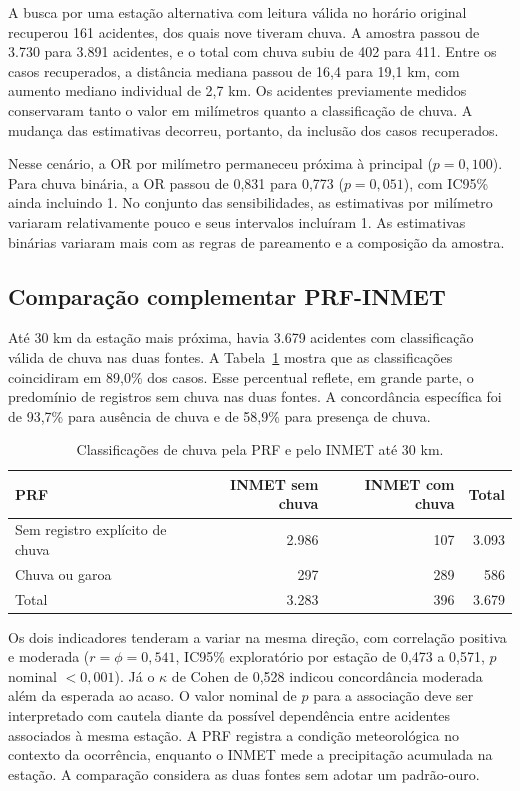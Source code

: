 \documentclass[12pt]{article}
\begin{document}
A busca por uma estação alternativa com leitura válida no horário
original recuperou 161 acidentes, dos quais nove tiveram chuva.
A amostra passou de 3.730 para 3.891 acidentes, e o total com chuva
subiu de 402 para 411. Entre os casos recuperados, a distância mediana
passou de 16,4 para 19,1 km, com aumento mediano individual de 2,7 km.
Os acidentes previamente medidos conservaram tanto o valor em
milímetros quanto a classificação de chuva. A mudança das estimativas
decorreu, portanto, da inclusão dos casos recuperados.

Nesse cenário, a OR por milímetro permaneceu próxima à principal
($p=0{,}100$). Para chuva binária, a OR passou de 0,831 para 0,773
($p=0{,}051$), com IC95\% ainda incluindo 1. No conjunto das
sensibilidades, as estimativas por milímetro variaram relativamente
pouco e seus intervalos incluíram 1. As estimativas binárias
variaram mais com as regras de pareamento e a composição da amostra.

\subsection{Comparação complementar PRF-INMET}

Até 30 km da estação mais próxima, havia 3.679 acidentes com
classificação válida de chuva nas duas fontes. A Tabela~\ref{tab:prf-inmet}
mostra que as classificações coincidiram em 89,0\% dos casos. Esse
percentual reflete, em grande parte, o predomínio de registros sem
chuva nas duas fontes. A concordância específica foi de 93,7\% para
ausência de chuva e de 58,9\% para presença de chuva.

\begin{table}[H]
    \centering
    \caption{Classificações de chuva pela PRF e pelo INMET até 30 km.}
    \label{tab:prf-inmet}
    \begin{tabular}{lrrr}
        \toprule
        PRF & INMET sem chuva & INMET com chuva & Total \\
        \midrule
        Sem registro explícito de chuva & 2.986 & 107 & 3.093 \\
        Chuva ou garoa & 297 & 289 & 586 \\
        \midrule
        Total & 3.283 & 396 & 3.679 \\
        \bottomrule
    \end{tabular}
\end{table}

Os dois indicadores tenderam a variar na mesma direção, com correlação
positiva e moderada ($r=\phi=0{,}541$, IC95\% exploratório por estação
de 0,473 a 0,571, $p$ nominal $<0{,}001$). Já o $\kappa$ de Cohen de
0,528 indicou concordância moderada além da esperada ao acaso.
O valor nominal de $p$ para a associação deve ser interpretado com
cautela diante da possível dependência entre acidentes associados
à mesma estação. A PRF registra a condição meteorológica no contexto
da ocorrência, enquanto o INMET mede a precipitação acumulada na
estação. A comparação considera as duas fontes sem adotar um
padrão-ouro.
\end{document}
